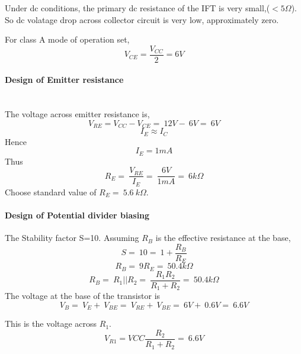 \documentclass{book}
\begin{document}
\noindent Under dc  conditions, the primary dc resistance of the IFT is very small,($<5\Omega$). So dc volatage drop across collector circuit is very low, approximately zero.

\noindent For class A mode of operation set, 
\begin{equation}
 V_{CE} = \frac{V_{CC}}{2}= 6 V
\end{equation}
\paragraph{Design of Emitter resistance}
\noindent \\The voltage across emitter resistance is,
\begin{equation}
V_{RE}=V_{CC}- V_{CE} =\ 12V-\ 6V=\ 6V
\end{equation}
\begin{equation}
I_E \approx I_C 
 \end{equation}
\noindent Hence
\begin{equation}
I_E = 1mA
\end{equation}
\noindent Thus
\begin{equation}
R_E=\ \frac{V_{RE}}{I_E}=\ \frac{6V}{1mA}=\ 6k\Omega
\end{equation}
\noindent Choose standard value of $R_E=\ 5.6 \ k\Omega$.
\paragraph{Design of Potential divider biasing\\}
\noindent The Stability factor S=10. Assuming $R_B$ is the effective resistance at the base,
\begin{equation}
S=\ 10=\ 1+\frac{R_B}{R_E}
\end{equation}
\begin{equation}
R_B=\ 9R_E=\ 50.4k\Omega
\end{equation}
\begin{equation}
\label{R1R2}
R_B=\ R_1||R_2=\ \frac{R_1R_2}{R_1+R_2}=\ 50.4k\Omega
\end{equation}
\noindent The voltage at the base of the transistor is 
\begin{equation}
V_B=\ V_E+\ V_{BE}=\ V_{RE}+\ V_{BE}=\ 6V+\ 0.6V=\ 6.6 V
\end{equation}

\noindent This is the voltage across $R_1$. 
\begin{equation}
V_{R1}= V{CC} \frac{R_2}{R_1+R_2}=\ 6.6V
\end{equation}
\end{document}

